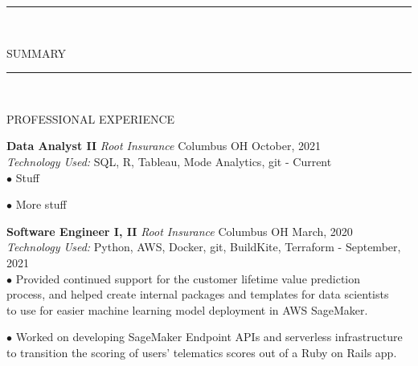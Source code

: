 \documentclass[12pt]{article}
\newcommand\tab[1][1cm]{\hspace*{#1}}
\newcommand\header[1][Section Header]{
    \vspace*{-2mm}
    \rule{6.5in}{3pt} \\
    \smallskip
    \begin{large}
	    \textsc{\textcolor{lblue}{#1}}
    \end{large}
    \medskip
}
\begin{document}
  \pagestyle{empty} %

  \begin{flushleft}
    \header[SUMMARY]

    \smallskip
  \end{flushleft}

  \begin{flushleft}
    \header[PROFESSIONAL EXPERIENCE]

    \textbf{Data Analyst II} \tab[.25cm] \textit{Root Insurance} \tab[.15cm] \small {Columbus OH} \hfill \small {October, 2021} \\
    \tab[0.5cm] \textit{Technology Used:} SQL, R, Tableau, Mode Analytics, git \hfill \small {{-} Current} \\

    \tab $\bullet$ Stuff \\
    \vspace*{0.5mm}

    \tab $\bullet$ More stuff \\
    \medskip

    \textbf{Software Engineer I, II} \tab[.25cm] \textit{Root Insurance} \tab[.15cm] \small {Columbus OH} \hfill \small {March, 2020} \\
    \tab[0.5cm] \textit{Technology Used:} Python, AWS, Docker, git, BuildKite, Terraform \hfill \small {{-} September, 2021} \\

    \tab $\bullet$ Provided continued support for the customer lifetime value prediction \\
    \tab[1.25cm] process, and helped create internal packages and templates for data scientists \\
    \tab[1.25cm] to use for easier machine learning model deployment in AWS SageMaker. \\
    \vspace*{0.5mm}

    \tab $\bullet$ Worked on developing SageMaker Endpoint APIs and serverless infrastructure \\
    \tab[1.25cm] to transition the scoring of users' telematics scores out of a Ruby on Rails app. \\
    \medskip


\end{flushleft}
\end{document}
